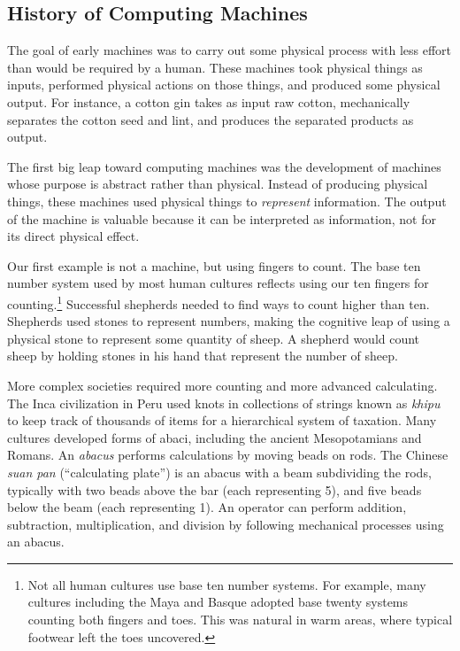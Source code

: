 \begin{schemeregion}
\section{History of Computing Machines}\label{sec:computing-machines}

The goal of early machines was to carry out some physical process with less effort than would be required by a human.  These machines took physical things as inputs, performed physical actions on those things, and produced some physical output.  For instance, a cotton gin takes as input raw cotton, mechanically separates the cotton seed and lint, and produces the separated products as output.  

The first big leap toward computing machines was the development of machines whose purpose is abstract rather than physical.  Instead of producing physical things, these machines used physical things to {\em represent} information.  The output of the machine is valuable because it can be interpreted as information, not for its direct physical effect.

Our first example is not a machine, but using fingers to count.  The base ten number system used by most human cultures reflects using our ten fingers for counting.\footnote{Not all human cultures use base ten number systems.  For example, many cultures including the Maya and Basque adopted base twenty systems counting both fingers and toes.  This was natural in warm areas, where typical footwear left the toes uncovered.}  Successful shepherds needed to find ways to count higher than ten.  Shepherds used stones to represent numbers, making the cognitive leap of using a physical stone to represent some quantity of sheep.  A shepherd would count sheep by holding stones in his hand that represent the number of sheep.

More complex societies required more counting and more advanced calculating.  The Inca civilization in Peru used knots in collections of strings known as {\em khipu}
to keep track of thousands of items for a hierarchical system of taxation. Many cultures developed forms of abaci, including the ancient Mesopotamians and Romans.  An {\em abacus} performs calculations by moving beads on rods.  The Chinese {\em suan pan} (``calculating plate'')  %
is an abacus with a beam subdividing the rods, typically with two beads above the bar (each representing 5), and five beads below the beam (each representing 1).  An operator can perform addition, subtraction, multiplication, and division by following mechanical processes using an abacus.


\end{schemeregion}
